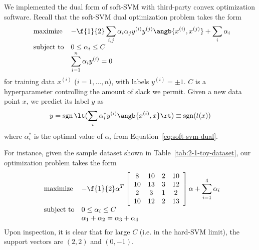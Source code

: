 \documentclass{article}
\DeclareMathOperator{\sgn}{sgn}
\newcommand{\sind}[1]{^{(#1)}}
\begin{document}
\begin{multicols}{2}
We implemented the dual form of soft-SVM
with third-party convex optimization software.
Recall that the soft-SVM dual optimization problem takes the form
\begin{equation}
    \label{eq:soft-svm-dual}
    \begin{array}{ll@{}ll}
        \text{maximize}  &\displaystyle -\f{1}{2}\sum_{i,j} \alpha_i \alpha_j y\sind{i} y\sind{j} \angb{x\sind{i}, x\sind{j}}
        +
        \sum_i \alpha_i \\
        \text{subject to}& 0 \le \alpha_i \le C\\
        & \displaystyle\sum_{i=1}^n \alpha_i y\sind{i} = 0
    \end{array}
\end{equation}
for training data $x\sind{i}$ ($i=1, \dots, n$),
with labels $y\sind i = \pm 1$.
$C$ is a hyperparameter controlling the amount of slack we permit.
Given a new data point $x$,
we predict its label $y$ as
\begin{equation}
    \label{eq:soft-svm-predict}
    y = \sgn\lt(\sum_i \alpha^*_i y\sind{i} \angb{x\sind{i}, x}\rt) \equiv \sgn(t(x))
\end{equation}
where $\alpha^*_i$ is the optimal value of $\alpha_i$
from Equation~\ref{eq:soft-svm-dual}.

For instance, given the sample dataset shown
in Table~\ref{tab:2-1-toy-dataset},
our optimization problem takes the form
\begin{equation}
    \label{eq:soft-svm-dual-concrete}
    \begin{array}{ll@{}ll}
        \text{maximize}  &\displaystyle -\f{1}{2}\alpha^T
        \left[
            \begin{array}{cccc}
                8 & 10 & 2 & 10 \\
                10 & 13 & 3 & 12 \\
                2 & 3 & 1 & 2 \\
                10 & 12 & 2 & 13
            \end{array}
        \right]
        \alpha
        +
        \sum_{i=1}^4 \alpha_i \\
        \text{subject to}& 0 \le \alpha_i \le C\\
        & \alpha_1 + \alpha_2 = \alpha_3 + \alpha_4
    \end{array}
\end{equation}
Upon inspection,
it is clear that for large $C$
(i.e. in the hard-SVM limit),
the support vectors are $(2,2)$ and $(0,-1)$.


\end{multicols}
\end{document}
